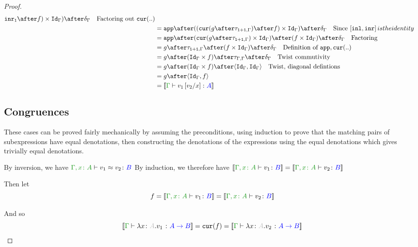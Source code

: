 \documentclass{report}
\begin{document}
\begin{framed}
\begin{proof}
{{\begin{align*}
{                }{
                    \inr_\1
                }\after f)\times \idg)\after\diag{\G}\qt{Factoring out $\cur{..}$}\\
                & = \app\after((\cur{g\after\twist{\1+\1}{\G}}\after f)\times \idg)\after\diag{\G}\qt{Since $\fld{\inl}{\inr} is the identity$}\\
                & = \app\after(\cur{g\after\twist{\1+\1}{\G}}\times \idg)\after (f\times \idg)\after\diag{\G}\qt{Factoring}\\
               & = g\after\twist{\1+\1}{\G} \after (f\times \idg)\after\diag{\G} \qt{Definition of $\app,\cur{..}$}\\
               & = g\after(\idg\times f)\after \twist{\G}{\G} \after\diag{\G} \qt{Twist commutivity}\\
               & = g\after(\idg\times f) \after\pr{\idg}{\idg} \qt{Twist, diagonal defintions} \\
               & = g\after\pr{\idg}{f} \\
               & = \deno{\gtyperelation{v_1\ssub{x}{v_2}}{ A}}
            \end{align*}
            }}
        
        
        \subsection{Congruences}
        These cases can be proved fairly mechanically by assuming the preconditions, using induction to prove that the matching pairs of subexpressions have equal denotations, then constructing the denotations of the expressions using the equal denotations which gives trivially equal denotations.
        
            By inversion, we have $\berelation{\gax}{v_1}{v_2}{B}$
            By induction, we therefore have $\deno{\typerelation{\gax}{v_1}{B}} = \deno{\typerelation{\gax}{v_2}{B}}$
        
            Then let
            \begin{equation}
                f = \deno{\typerelation{\gax}{v_1}{B}} = \deno{\typerelation{\gax}{v_2}{B}}
            \end{equation}
        
            And so
            \begin{equation}
                \deno{\gtyperelation{\lam{x}{A}{v_1}}{\ab}} = \cur{f} = \deno{\gtyperelation{\lam{x}{A}{v_2}}{\ab}}
            \end{equation}
        

\end{proof}
\end{framed}
\end{document}
